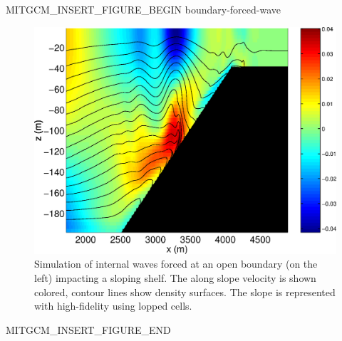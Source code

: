 \begin{rawhtml}MITGCM_INSERT_FIGURE_BEGIN boundary-forced-wave\end{rawhtml}
\begin{figure}
\begin{center}
  \includegraphics[width=\textwidth]{s_overview/figs/TUt8000slope.eps}
\end{center}
\caption{Simulation of internal waves forced at an open boundary (on the left)
impacting a sloping shelf. The along slope velocity is shown colored, contour
lines show density surfaces. The slope is represented with high-fidelity using
lopped cells.}
\label{fig:boundary-forced-wave}
\end{figure}
\begin{rawhtml}MITGCM_INSERT_FIGURE_END\end{rawhtml}
